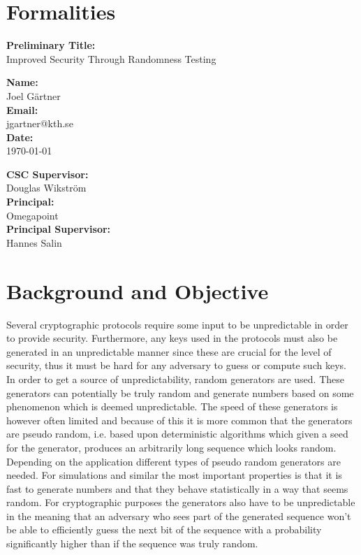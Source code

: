 \documentclass[a4paper,11pt]{report}
\begin{document}
\section*{Formalities}
\begin{center}
\textbf{Preliminary Title:}\\ Improved Security Through Randomness Testing
\end{center}

\begin{minipage}[t]{7cm}
\textbf{Name:}\\ Joel Gärtner\\
\textbf{Email:}\\ jgartner@kth.se\\
\textbf{Date:}\\ \today
\end{minipage}
\begin{minipage}[t]{7cm}
\textbf{CSC Supervisor:}\\ Douglas Wikström \\
\textbf{Principal:}\\
Omegapoint \\
\textbf{Principal Supervisor:}\\
 Hannes Salin\\
\end{minipage}
\section*{Background and Objective}
Several cryptographic protocols require some input to be unpredictable 
in order to provide security. Furthermore, any keys used in the protocols 
must also be generated in an unpredictable manner since these are crucial for 
the level of security, thus it must be hard for any adversary to guess or 
compute such keys. In order to get a source of unpredictability,
random generators are used.  These generators can potentially 
be truly random and generate numbers based on some phenomenon which is deemed 
unpredictable. The speed of these generators is however often limited and because
of this it is more common that the generators are pseudo random, i.e.
based upon deterministic algorithms which given a seed for the generator,
produces an arbitrarily long sequence which looks random.
Depending on the application different types of pseudo random generators
are needed. For simulations and similar the most important properties 
is that it is fast to generate numbers and that they behave statistically
in a way that seems random. For cryptographic purposes the generators 
also have to be unpredictable in the meaning that an adversary who sees part
of the generated sequence won't be able to efficiently guess the next bit 
of the sequence with a probability significantly higher than if the sequence 
was truly random. \\
\end{document}
